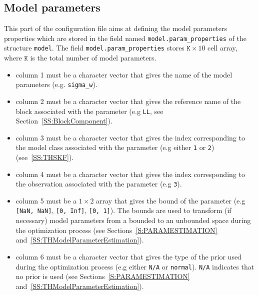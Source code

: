 \subsection{Model parameters}
\label{SS:ModelParamProperties}
This part of the configuration file aims at defining the model parameters properties which are stored in the field named \lstinline[basicstyle = \mlttfamily \small ]!model.param_properties! of the \MATLAB{} structure \lstinline[basicstyle = \mlttfamily \small ]!model!.
The field \lstinline[basicstyle = \mlttfamily \small ]!model.param_properties! stores $\mathtt{K} \times 10$ cell array, where $\mathtt{K}$ is the total number of model parameters.
\begin{itemize}
\item column 1 must be a character vector that gives the name of the model parameters (e.g.  \lstinline[basicstyle = \mlttfamily \small ]!sigma_w!). 
\item column 2 must be a character vector that gives the reference name of the block associated with the parameter (e.g \lstinline[basicstyle = \mlttfamily \small ]!LL!, see Section~\ref{SS:BlockComponent}).
\item column 3 must be a character vector that gives the index corresponding to the model class associated with the parameter (e.g  either \lstinline[basicstyle = \mlttfamily \small ]!1! or \lstinline[basicstyle = \mlttfamily \small ]!2!) (see~\ref{SS:THSKF}).
\item column 4 must be a character vector that gives the index corresponding to the observation associated with the parameter (e.g \lstinline[basicstyle = \mlttfamily \small ]!3!).
\item column 5 must be a $1\times2$ array that gives the bound of the parameter (e.g \lstinline[basicstyle = \mlttfamily \small ]![NaN, NaN]!,  \lstinline[basicstyle = \mlttfamily \small ]![0, Inf]!, \lstinline[basicstyle = \mlttfamily \small ]![0, 1]!). 
The bounds are used to transform (if necessary) model parameters from a bounded to  an unbounded space during the optimization process (see Sections~\ref{S:PARAMESTIMATION} and~\ref{SS:THModelParameterEstimation}).
\item column 6 must be a character vector that gives the type of the prior used during the optimization process (e.g  either \lstinline[basicstyle = \mlttfamily \small ]!N/A! or \lstinline[basicstyle = \mlttfamily \small ]!normal!). 
\lstinline[basicstyle = \mlttfamily \small ]!N/A! indicates that no prior is used (see Sections~\ref{S:PARAMESTIMATION} and~\ref{SS:THModelParameterEstimation}).

\end{itemize}
